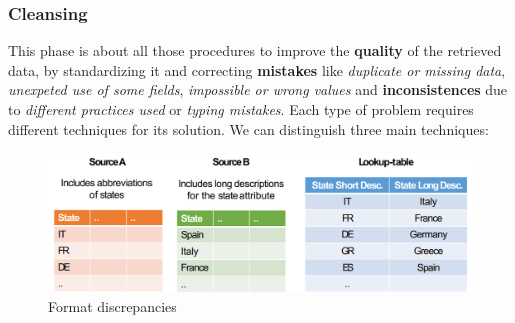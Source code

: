 \subsubsection{Cleansing}
This phase is about all those procedures to improve the \textbf{quality} of the retrieved data, by standardizing it and correcting \textbf{mistakes} like \textit{duplicate or missing data}, \textit{unexpeted use of some fields}, \textit{impossible or wrong values} and \textbf{inconsistences} due to \textit{different practices used} or \textit{typing mistakes}. Each type of problem requires different techniques for its solution. We can distinguish three main techniques:
\begin{figure}[ht!]
    \centering
    \includegraphics[scale=0.34]{images/ETL_dict_based_techniques.png}
    \caption{Format discrepancies}
    \label{figDictBasedTec}
\end{figure}

